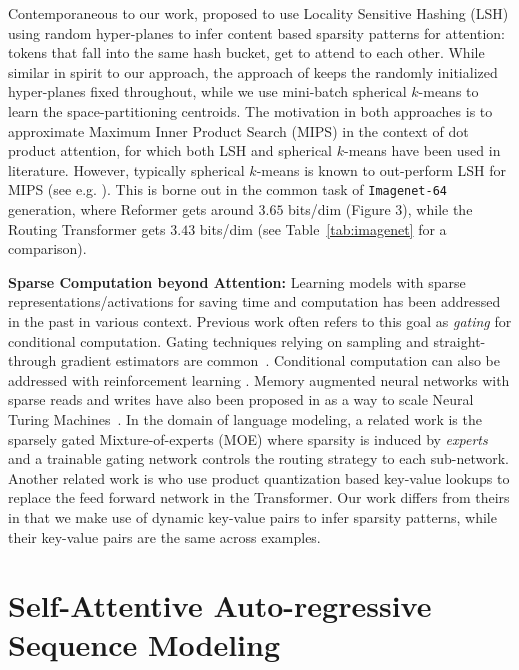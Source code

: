 \documentclass[a4paper]{article}
\begin{document}
Contemporaneous to our work, \citet{kitaev2020reformer} proposed to use Locality Sensitive Hashing (LSH)
using random hyper-planes to infer content based sparsity patterns for attention: tokens that fall into the same
hash bucket, get to attend to each other. While similar in spirit
to our approach, the approach of \citet{kitaev2020reformer} keeps the randomly initialized hyper-planes
fixed throughout, while we use mini-batch spherical \(k\)-means to learn the space-partitioning centroids.
The motivation in both approaches is to approximate Maximum Inner Product Search (MIPS) in the context of
dot product attention, for which both LSH and spherical \(k\)-means have been used in literature. However, 
typically spherical \(k\)-means is known to out-perform LSH for MIPS (see e.g. \citet{auvolat2015clustering}).
This is borne out in the common task of \texttt{Imagenet-64} generation, 
where Reformer gets around \(3.65\) bits/dim (Figure 3), while the Routing Transformer gets \(3.43\) bits/dim (see Table~\ref{tab:imagenet} for a comparison).

{\bf Sparse Computation beyond Attention:}
Learning models with sparse representations/activations for saving time and computation
has been addressed in the past in various context. Previous work often refers to this goal as
\emph{gating} for conditional computation. Gating techniques relying on sampling and 
straight-through gradient estimators are common~\citep{bengio2013estimating,eigen2013learning,cho2014exponentially}. 
Conditional computation can also be addressed with reinforcement learning 
\citep{denoyer2014deep, indurthi2019look}. Memory augmented neural networks 
with sparse reads and writes have also been proposed in \citet{rae2016scaling}
as a way to scale Neural Turing Machines~\citep{graves2014neural}.
In the domain of language modeling, 
a related work is the sparsely gated Mixture-of-experts (MOE)  
\citep{shazeer2017outrageously} where sparsity is induced by \emph{experts} 
and a trainable gating network controls the routing strategy to each 
sub-network. Another related work is \citet{lample2019large} who use product
quantization based key-value lookups to replace the feed forward network
in the Transformer. Our work differs from theirs in that we make use of dynamic
key-value pairs to infer sparsity patterns, while their key-value pairs are
the same across examples.
\section{Self-Attentive Auto-regressive Sequence Modeling}
\label{sec:attention}
\end{document}
